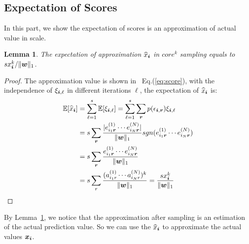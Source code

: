 \documentclass[letterpaper]{article}
\newcommand{\Sca}[3]{{#1}^{(#2)}_{i_#2#3}}%
\newcommand{\anr}[2]{\Sca{a}{#1}{#2}}
\newcommand{\enr}[2]{\Sca{e}{#1}{\V{#2}}}
\newcommand{\score}[1]{\xi_{\V{i},#1}}
\newcommand{\V}[1]{{\boldsymbol{{\MakeLowercase{#1}}}}}
\newcommand{\norm}[2]{\|#1\|_{#2}}
\newcommand{\Eqn}[1]   {Eq.(\ref{eq:#1})}
\newcommand{\Lem}[1]  {Lemma~\ref{lem:#1}}
\newcommand{\predx}{\widehat{x}_{\V{i}}}
\newtheorem{lemma}{Lemma}
\begin{document}
\subsection{Expectation of Scores}
In this part, we show the expectation of scores is an approximation of actual value in scale.
\begin{lemma}\label{lem:Expectation}
The expectation of approximation $\widehat{x}_{\V{i}}$ in $core^k$ sampling equals to $sx^k_{\V{i}}/\norm{\V{w}}{1}$.
\end{lemma}
\begin{proof}
    The approximation value is shown in ~\Eqn{score},
    with the independence of $\score{\ell}$ in different iterations $\ell$,
    the expectation of $\widehat{x}_{\V{i}}$ is:
\begin{align*}
\mathbb{E}[\predx]
& = \sum_{\ell=1}^{s}\mathbb{E}[\score{\ell}] = \sum_{\ell=1}^{s}\sum_{\V{r}} p(\epsilon_{\V{i},\V{r}})\score{\ell} \\
& = s\sum_{\V{r}} \frac{|\enr{1}{r}\cdots\enr{N}{r}|}{\norm{\V{W}}{1}}
                  sgn(\enr{1}{r}\cdots\enr{N}{r})\\
& = s\sum_{\V{r}} \frac{\enr{1}{r}\cdots\enr{N}{r}}{\norm{\V{W}}{1}}\\
& = s\sum_{r}\frac{(\anr{1}{r}\cdots\anr{N}{r})^k}{\norm{\V{W}}{1}}
= \frac{sx^k_{\V{i}}}{\norm{\V{w}}{1}}
\end{align*}
\end{proof}
By \Lem{Expectation}, we notice that the approximation after sampling
is an estimation of the actual prediction value.
So we can use the $\widehat{x}_{\V{i}}$ to approximate the actual values $\V{x}_{\V{i}}$.
\end{document}
